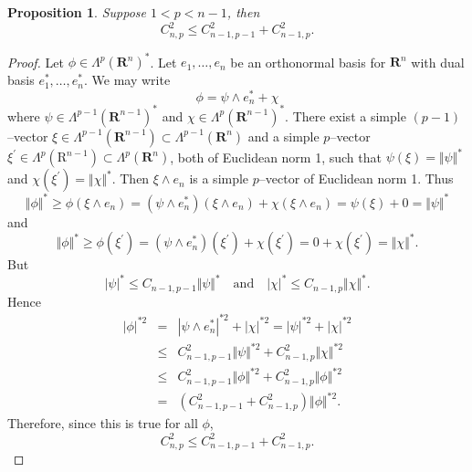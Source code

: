 \documentclass[12pt]{amsart}
\newtheorem{proposition}[theorem]{Proposition}
\theoremstyle{definition}
\theoremstyle{remark}
\numberwithin{equation}{section}
\begin{document}
\begin{proposition}\label{p:i1}%
Suppose $1<p<n-1$, then
\begin{equation*}
 C_{n,p}^2  \leq C_{n-1,p-1}^2 + C_{n-1,p}^2.
 \end{equation*}
\end{proposition}
\begin{proof}
Let $\phi \in \Lambda^p(\mathbf{R}^n)^\ast$. Let $e_1,\dots,e_n$ be an orthonormal basis for $\mathbf{R}^n$ with dual basis $e_1^\ast,\dots,e_n^\ast$. We may write
\begin{equation*}
\phi = \psi\wedge e^\ast_n + \chi
\end{equation*}
where $\psi \in \Lambda^{p-1}(\mathbf{R}^{n-1})^\ast$ and $\chi \in \Lambda^p(\mathbf{R}^{n-1})^\ast$. There exist a  simple $(p-1)$--vector $\xi \in \Lambda^{p-1}(\mathbf{R}^{n-1}) \subset \Lambda^{p-1}(\mathbf{R}^n)$ and a simple $p$--vector $\xi^\prime \in \Lambda^{p} (\mathrm{R}^{n-1}) \subset \Lambda^{p} (\mathbf{R}^n)$, both of Euclidean norm 1, such that $\psi(\xi) = \Vert\psi\Vert^\ast$ and
$\chi(\xi^\prime) = \Vert \chi\Vert^\ast$. Then $\xi \wedge e_n$ is a simple $p$--vector  of Euclidean norm 1. Thus
\begin{equation*}
\Vert\phi\Vert^\ast \geq \phi(\xi \wedge e_n) = (\psi\wedge e^\ast_n)(\xi\wedge e_n) + \chi(\xi\wedge e_n)= \psi(\xi) + 0 = \Vert\psi\Vert^\ast 
\end{equation*}
and
\begin{equation*}
\Vert\phi\Vert^\ast \geq \phi(\xi^\prime) = (\psi\wedge e^\ast_n)(\xi^\prime) + \chi(\xi^\prime)=  0 +\chi(\xi^\prime) = \Vert\chi\Vert^\ast. 
\end{equation*}
But
\begin{equation*}
 |\psi|^{\ast} \leq C_{n-1,p-1} \Vert\psi\Vert^{\ast}\quad\mathrm{and}\quad |\chi|^{\ast} \leq C_{n-1,p} \Vert\chi\Vert^{\ast}.
 \end{equation*}
Hence
\begin{eqnarray*}
 |\phi|^{\ast 2} &=& |\psi\wedge e_n^\ast|^{\ast 2} + |\chi|^{\ast 2}=  |\psi|^{\ast 2} + |\chi|^{\ast 2}\\ 
 &\leq&  C_{n-1,p-1}^2 \Vert\psi\Vert^{\ast 2}+ C_{n-1,p}^2 \Vert\chi\Vert^{\ast 2}\\ 
 &\leq&  C_{n-1,p-1}^2 \Vert\phi\Vert^{\ast 2}+ C_{n-1,p}^2 \Vert\phi\Vert^{\ast 2}\\ 
 &=& (C_{n-1,p-1}^2+C_{n-1,p}^2) \Vert \phi\Vert^{\ast 2}.
 \end{eqnarray*}
 Therefore, since this is true for all $\phi$,
 $$ C_{n,p}^2  \leq C_{n-1,p-1}^2 + C_{n-1,p}^2.$$
\end{proof}
\end{document}
